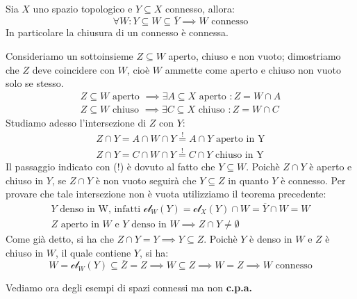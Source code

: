 \begin{theorema}~{}\label{chiusuraconnessa}\\
Sia $X$ uno spazio topologico e $Y\subseteq X$ connesso, allora:
		\begin{equation}
			\forall W \colon Y\subseteq W \subseteq \overline{Y} \implies W \text{ connesso}
		\end{equation}
	In particolare la chiusura di un connesso è connessa.
\end{theorema}
\begin{demonstration}
	Consideriamo un sottoinsieme $Z\subseteq W$ aperto, chiuso e non vuoto; dimostriamo che $Z$ deve coincidere con $W$, cioè $W$ ammette come aperto e chiuso non vuoto solo se stesso.
		\begin{gather*}
			Z\subseteq W \text{ aperto } \implies \exists A\subseteq X \text{ aperto } \colon Z=W\cap A \\
			Z\subseteq W \text{ chiuso } \implies \exists C\subseteq X \text{ chiuso } \colon Z=W\cap C
		\end{gather*}
	Studiamo adesso l'intersezione di $Z$ con $Y$:
		\begin{gather*}
			Z\cap Y=A\cap W\cap Y \stackrel{!}{=} A\cap Y \text{ aperto in Y}\\
			Z\cap Y=C\cap W\cap Y \stackrel{!}{=} C\cap Y \text{ chiuso in Y}
		\end{gather*}
	Il passaggio indicato con (!) è dovuto al fatto che $Y\subseteq W$. Poichè $Z\cap Y$ è aperto e chiuso in $Y$, se $Z\cap Y$ è non vuoto seguirà che $Y\subseteq Z$ in quanto $Y$ è connesso. Per provare che tale intersezione non è vuota utilizziamo il teorema precedente:
		\begin{gather*}
			Y \text{ denso in W, infatti } \mathcal{cl}_W(Y)=\mathcal{cl}_X(Y)\cap W=\overline{Y}\cap W=W\\
			Z \text{ aperto in } W\text{ e } Y \text{ denso in } W \implies Z\cap Y \neq \emptyset
		\end{gather*}
	Come già detto, si ha che $Z\cap Y=Y \implies Y\subseteq Z$. Poichè $Y$ è denso in $W$ e $Z$ è chiuso in $W$, il quale contiene $Y$, si ha:
		\begin{equation*}
			W=\mathcal{cl}_W(Y)\subseteq \overline{Z}=Z \implies W\subseteq Z \implies W=Z \implies W \text{ connesso}
		\end{equation*}
\vspace{-3mm}
\end{demonstration}
Vediamo ora degli esempi di spazi connessi ma non \textbf{c.p.a.}
